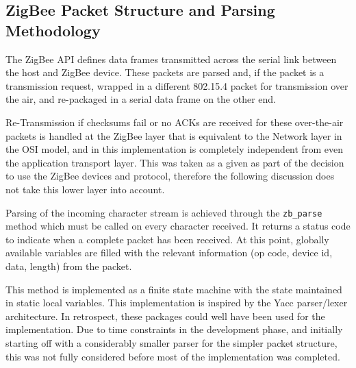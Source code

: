 \subsection{ZigBee Packet Structure and Parsing Methodology}
The ZigBee API defines data frames transmitted across the serial link between the host and ZigBee device. These packets are parsed and, if the packet is a transmission request, wrapped in a different 802.15.4 packet for transmission over the air, and re-packaged in a serial data frame on the other end.

Re-Transmission if checksums fail or no ACKs are received for these over-the-air packets is handled at the ZigBee layer that is equivalent to the Network layer in the OSI model, and in this implementation is completely independent from even the application transport layer. This was taken as a given as part of the decision to use the ZigBee devices and protocol, therefore the following discussion does not take this lower layer into account.


Parsing of the incoming character stream is achieved through the \texttt{zb\_parse} method which must be called on every character received. It returns a status code to indicate when a complete packet has been received. At this point, globally available variables are filled with the relevant information (op code, device id, data, length) from the packet.

This method is implemented as a finite state machine with the state maintained in static local variables. This implementation is inspired by the Yacc parser/lexer architecture. In retrospect, these packages could well have been used for the implementation. Due to time constraints in the development phase, and initially starting off with a considerably smaller parser for the simpler packet structure, this was not fully considered before most of the implementation was completed. 

